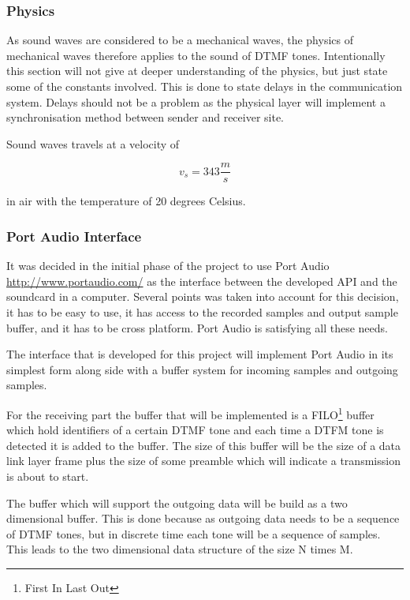 		\subsubsection{Physics}
		As sound waves are considered to be a mechanical waves, the physics of mechanical waves therefore
		applies to the sound of DTMF tones. Intentionally this section will not give at deeper understanding
		of the physics, but just state some of the constants involved. This is done to state delays in the
		communication system. Delays should not be a problem as the physical layer will implement a
		synchronisation method between sender and receiver site.
		
		Sound waves travels at a velocity of
		\begin{center}\begin{equation}v_{s} = 343 \frac{m}{s}\end{equation}\end{center}
		in air with the temperature of 20 degrees Celsius.
		
		\subsubsection{Port Audio Interface}
		It was decided in the initial phase of the project to use Port Audio \url{http://www.portaudio.com/}
		as the interface between the developed API and the soundcard in a computer. Several points
		was taken into account for this decision, it has to be easy to use, it has access to the recorded
		samples and output sample buffer, and it has to be cross platform. Port Audio is satisfying all these needs.

		The interface that is developed for this project will implement Port Audio in its simplest
		form along side with a buffer system for incoming samples and outgoing samples.
		
		For the receiving part the buffer that will be implemented is a FILO\footnote{First In Last Out}
		buffer which hold identifiers of a certain DTMF tone and each time a DTFM tone is detected it is added
		to the buffer. The size of this buffer will be the size of a data link layer frame plus the size of some
		preamble which will indicate a transmission is about to start.
		
		The buffer which will support the outgoing data will be build as a two dimensional buffer. This
		is done because as outgoing data needs to be a sequence of DTMF tones, but in discrete time each
		tone will be a sequence of samples. This leads to the two dimensional data structure of the size N times M.
		
